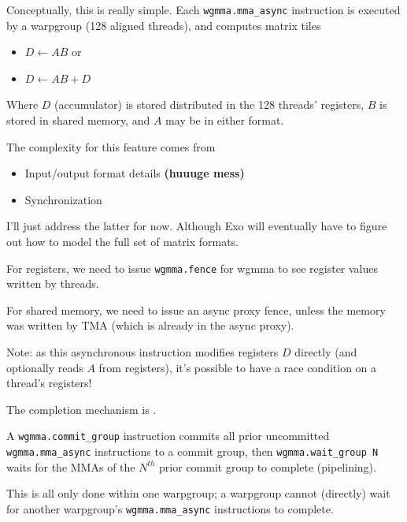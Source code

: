 \newpage
{}

\begin{minipage}[t]{0.5\textwidth}\fixminipage
Conceptually, this is really simple.
Each \texttt{wgmma.mma\_async} instruction is executed by a warpgroup (128 aligned threads), and computes matrix tiles
\begin{itemize}
  \item $D \leftarrow AB$ or
  \item $D \leftarrow AB + D$
\end{itemize}
Where $D$ (accumulator) is stored distributed in the 128 threads' registers, $B$ is stored in shared memory, and $A$ may be in either format.

The complexity for this feature comes from
\begin{itemize}
  \item Input/output format details \textbf{(huuuge mess)}
  \item Synchronization
\end{itemize}
I'll just address the latter for now.
Although Exo will eventually have to figure out how to model the full set of matrix formats.
\end{minipage}
\hfill
\begin{minipage}[t]{0.5\textwidth}\fixminipage
{}

For registers, we need to issue \texttt{wgmma.fence} for wgmma to see register values written by threads.

For shared memory, we need to issue an async proxy fence, unless the memory was written by TMA (which is already in the async proxy).

Note: as this asynchronous instruction modifies registers $D$ directly (and optionally reads $A$ from registers), it's possible to have a race condition on a thread's registers!


The completion mechanism is .

A \texttt{wgmma.commit\_group} instruction commits all prior uncommitted \texttt{wgmma.mma\_async} instructions to a commit group, then \texttt{wgmma.wait\_group N} waits for the MMAs of the $N^{th}$ prior commit group to complete (pipelining).

This is all only done within one warpgroup; a warpgroup cannot (directly) wait for another warpgroup's \texttt{wgmma.mma\_async} instructions to complete.
\end{minipage}

